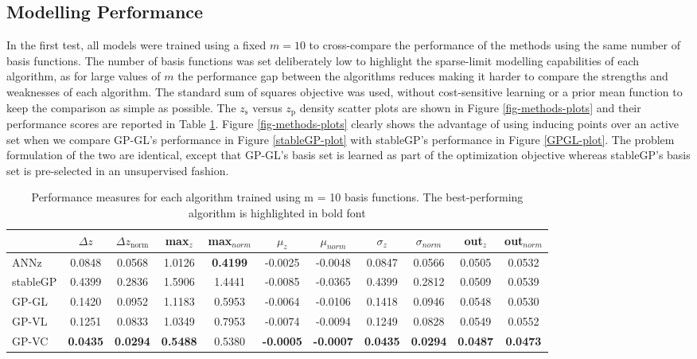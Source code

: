 \documentclass[useAMS,usenatbib,fleqn]{mn2e}
\begin{document}
\subsection{Modelling Performance}

In the first test, all models were trained using a fixed $m=10$ to cross-compare the performance of the methods using the same number of basis functions. The number of basis functions was set deliberately low to highlight the sparse-limit modelling capabilities of each algorithm, as for large values of $m$ the performance gap between the algorithms reduces making it harder to compare the strengths and weaknesses of each algorithm. The standard sum of squares objective was used, without cost-sensitive learning or a prior mean function to keep the comparison as simple as possible. The $z_\textrm{s}$ versus $z_\textrm{p}$ density scatter plots are shown in Figure \ref{fig-methods-plots} and their performance scores are reported in Table \ref{table-10-basis}. Figure \ref{fig-methods-plots} clearly shows the advantage of using inducing points over an active set when we compare GP-GL's performance in Figure \ref{stableGP-plot} with {\sc stableGP}'s performance in Figure \ref{GPGL-plot}. The problem formulation of the two are identical, except that GP-GL's basis set is learned as part of the optimization objective whereas {\sc stableGP}'s basis set is pre-selected in an unsupervised fashion.

 \begin{table}
  \caption{Performance measures for each algorithm trained using m = 10 basis functions. The best-performing algorithm is highlighted in bold font}
\begin{center}
\begin{tabular}{| l | c | c |  c | c |  c | c |  c | c |  c | c | }
     				&	$\Delta z$	&	$\Delta z_\textrm{norm}$	&	max$_{z}$ & max$_{norm}$		&	$\mu_{z}$&	$\mu_{norm}$	& $\sigma_{z}$ & $\sigma_{norm}$ & out$_{z}$&out$_{norm}$\\	\hline
	{\sc ANNz}	&	0.0848		&	0.0568	&	1.0126			&	\textbf{0.4199}&	-0.0025			&	-0.0048&	0.0847		&	0.0566&	0.0505		&	0.0532	\\
	{\sc stableGP}	&	0.4399		&	0.2836	&	1.5906			&	1.4441&	-0.0085			&	-0.0365&	0.4399		&	0.2812&	0.0509		&	0.0539	\\
	GP-GL		&	0.1420		&	0.0952	&	1.1183			&	0.5953&	-0.0064			&	-0.0106&	0.1418		&	0.0946&	0.0548		&	0.0530	\\
	GP-VL		&	0.1251	&	0.0833	&	1.0349			&	0.7953&	-0.0074			&	-0.0094&	0.1249		&	0.0828&	0.0549		&	0.0552	\\
	GP-VC	&	\textbf{0.0435}	&	\textbf{0.0294}	 &	\textbf{0.5488	}		&	0.5380 &	\textbf{-0.0005}			&	\textbf{-0.0007}&	\textbf{0.0435	}	&	\textbf{0.0294} &	\textbf{0.0487}		&	\textbf{0.0473}	 \\\hline
  \end{tabular}
\end{center}
\label{table-10-basis}
\end{table}
\end{document}

